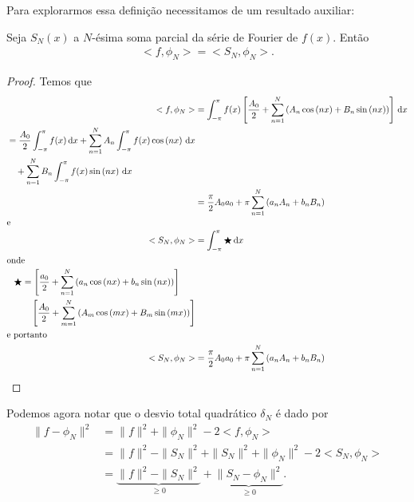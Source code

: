 Para explorarmos essa defini\c{c}\~{a}o necessitamos de um resultado auxiliar:
\begin{lem}
    Seja $S_N(x)$ a $N$-\'{e}sima soma parcial da s\'{e}rie de Fourier de $f(x)$. Ent\~{a}o
    \begin{align*}
        <f, \phi_N> = <S_N, \phi_N>.
    \end{align*}
\end{lem}
\begin{proof}
    Temos que
    \begin{align*}
        <f, \phi_N> &= \int_{-\pi}^\pi f(x) \left[ \frac{A_0}{2} + \sum_{n = 1}^N \left( A_n \cos\left( n x \right) + B_n \sin\left( n x \right) \right) \right] \, \mathrm{d}x \\
        \begin{split}
            &= \frac{A_0}{2} \int_{-\pi}^\pi f(x) \, \mathrm{d}x + \sum_{n = 1}^N A_n \int_{-\pi}^\pi f(x) \cos\left( n x \right) \, \mathrm{d}x \\
            &\quad {}+ \sum_{n = 1}^N B_n \int_{-\pi}^\pi f(x) \sin\left( n x \right) \, \mathrm{d}x
        \end{split} \\
        &= \frac{\pi}{2} A_0 a_0 + \pi \sum_{n = 1}^N \left( a_n A_n + b_n B_n \right) \\
        \intertext{e}
        <S_N, \phi_N> &= \int_{-\pi}^\pi \bigstar \, \mathrm{d}x \\
        \intertext{onde}
        \begin{split}
            \bigstar &= \left[ \frac{a_0}{2} + \sum_{n = 1}^N \left( a_n \cos\left( n x \right) + b_n \sin\left( n x \right) \right) \right] \\
            &\quad \left[ \frac{A_0}{2} + \sum_{m = 1}^N \left( A_m \cos\left( m x \right) + B_m \sin\left( m x \right) \right) \right]
        \end{split} \\
        \intertext{e portanto}
        <S_N, \phi_N> &= \frac{\pi}{2} A_0 a_0 + \pi \sum_{n =1}^N\left( a_n A_n + b_n B_n \right) \qedhere
    \end{align*}
\end{proof}

Podemos agora notar que o desvio total quadr\'{a}tico $\delta_N$ \'{e} dado por
\begin{align*}
    \| f - \phi_N \|^2 &= \| f \|^2 + \| \phi_N \|^2 - 2 <f, \phi_N> \\
    &= \| f \|^2 - \| S_N \|^2 + \| S_N \|^2 + \| \phi_N \|^2 - 2 <S_N, \phi_N> \\
    &= \underbrace{\| f \|^2 - \| S_N \|^2}_{\geq 0} + \underbrace{\| S_N - \phi_N \|^2}_{\geq 0}.
\end{align*}

